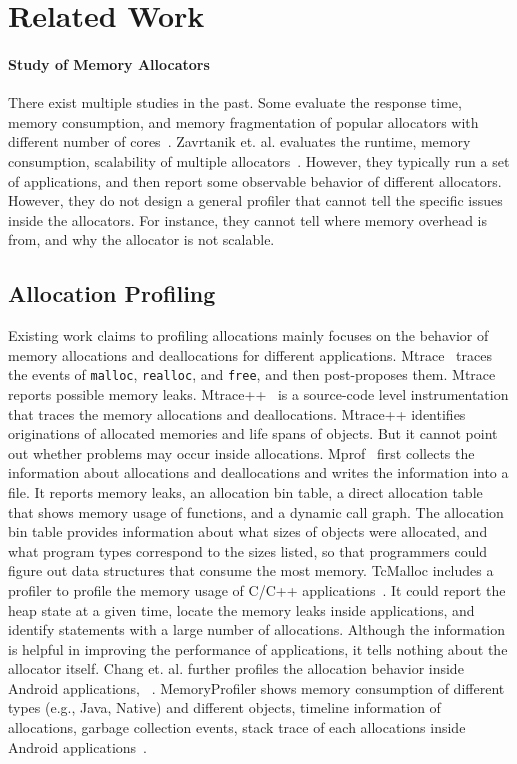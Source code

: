 \section{Related Work}
\label{sec:relatedwork}

\paragraph{Study of Memory Allocators} There exist multiple studies in the past. Some evaluate the response time, memory consumption, and memory fragmentation of  popular allocators with different number of cores~\cite{6084042, ferreira2011comparison}. Zavrtanik et. al. evaluates the runtime, memory consumption, scalability of multiple allocators~\cite{zavrtanikexperimental}. However, they typically run a set of applications, and then report some observable behavior of different allocators. However, they do not design a general profiler that cannot tell the specific issues inside the allocators. For instance, they cannot tell where memory overhead is from, and why the allocator is not scalable. 


\subsection{Allocation Profiling} Existing work claims to profiling allocations mainly focuses on the behavior of memory allocations and deallocations for different applications. Mtrace~\cite{mtrace} traces the events of \texttt{malloc}, \texttt{realloc}, and \texttt{free}, and then post-proposes them. Mtrace reports possible memory leaks. Mtrace++~\cite{Lee:2000:DMM:786772.787150} is a source-code level instrumentation that traces the memory allocations and deallocations. Mtrace++ identifies originations of allocated memories and life spans of objects. But it cannot point out whether problems may occur inside allocations. 
Mprof~\cite{Zorn:1988:MAP:894814} first collects the information about allocations and deallocations and writes the information into a file. It reports memory leaks, an allocation bin table, a direct allocation table that shows memory usage of functions, and a dynamic call graph. The allocation bin table provides information about what sizes of objects were allocated, and what program types correspond to the sizes listed, so that programmers could figure out data structures that consume the most memory. 
TcMalloc includes a profiler to profile the memory usage of C/C++ applications~\cite{ghemawat2007tcmalloc}. It could report the heap state at a given time, locate the memory leaks inside applications, and identify statements with a large number of allocations. Although the information is helpful in improving the performance of applications, it tells nothing about the allocator itself. Chang et. al. further profiles the allocation behavior inside Android applications, ~\cite{7031343}. MemoryProfiler shows memory consumption of different types (e.g., Java, Native) and different objects, timeline information of allocations, garbage collection events, stack trace of each allocations inside Android applications~\cite{MemoryProfiler}. 

